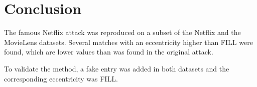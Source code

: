 \section{Conclusion}

The famous Netflix attack was reproduced on a subset of the Netflix and the MovieLens datasets. Several matches with an eccentricity higher than FILL were found, which are lower values than was found in the original attack. 

To validate the method, a fake entry was added in both datasets and the corresponding eccentricity was FILL. 